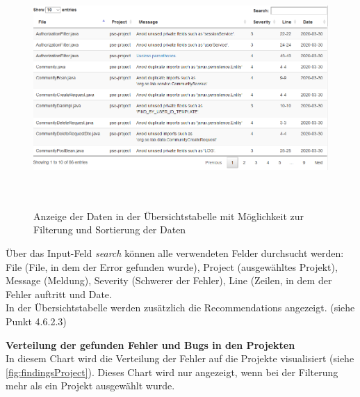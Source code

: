 \begin{figure}[tp]
  \centering
  \includegraphics[height=9cm]{images/pagination.PNG}
 \caption[Anzeige der Daten in der Übersichtstabelle mit Möglichkeit zur Filterung und Sortierung der Daten]{Anzeige der Daten in der Übersichtstabelle mit Möglichkeit zur Filterung und Sortierung der Daten}
  \label{fig:pagination}
\end{figure}

Über das Input-Feld \textit{search} können alle verwendeten Felder durchsucht werden: File (File, in dem der Error gefunden wurde), Project (ausgewähltes Projekt), Message (Meldung), Severity (Schwerer der Fehler), Line (Zeilen, in dem der Fehler auftritt und Date. \\ In der Übersichtstabelle werden zusätzlich die Recommendations angezeigt. (siehe Punkt 4.6.2.3) 

\textbf{Verteilung der gefunden Fehler und Bugs in den Projekten} \\
In diesem Chart wird die Verteilung der Fehler auf die Projekte visualisiert (siehe \ref{fig:findingsProject}). Dieses Chart wird nur angezeigt, wenn bei der Filterung mehr als ein Projekt ausgewählt wurde. 

